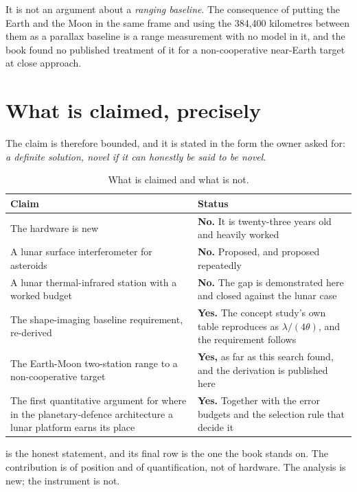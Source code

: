 It is not an argument about a \emph{ranging baseline}. The consequence of
putting the Earth and the Moon in the same frame and using the 384,400
kilometres between them as a parallax baseline is a range measurement with
no model in it, and the book found no published treatment of it for a
non-cooperative near-Earth target at close approach.

\section{What is claimed, precisely}

The claim is therefore bounded, and it is stated in the form the owner
asked for: \emph{a definite solution, novel if it can honestly be said to
be novel}.

\begin{table}[!htbp]
\centering
\small
\caption{What is claimed and what is not.}
\label{tab:claims}
\begin{tabularx}{\textwidth}{@{}P{2.57in}Y@{}}
\toprule
{}
\textbf{Claim} & \textbf{Status} \\
\midrule
The hardware is new & \textbf{No.} It is twenty-three years old and heavily
worked \\
A lunar surface interferometer for asteroids & \textbf{No.} Proposed, and
proposed repeatedly \\
A lunar thermal-infrared station with a worked budget & \textbf{No.} The
gap is demonstrated here and closed against the lunar case \\
The shape-imaging baseline requirement, re-derived & \textbf{Yes.} The
concept study's own table reproduces as \(\lambda/(4\theta)\), and the
requirement follows \\
The Earth-Moon two-station range to a non-cooperative target & \textbf{Yes,}
as far as this search found, and the derivation is published here \\
The first quantitative argument for where in the planetary-defence
architecture a lunar platform earns its place & \textbf{Yes.} Together with
the error budgets and the selection rule that decide it \\
\bottomrule
\end{tabularx}
\end{table}

 is the honest statement, and its final row is the one
the book stands on. The contribution is of position and of quantification,
not of hardware. The analysis is new; the instrument is not.

